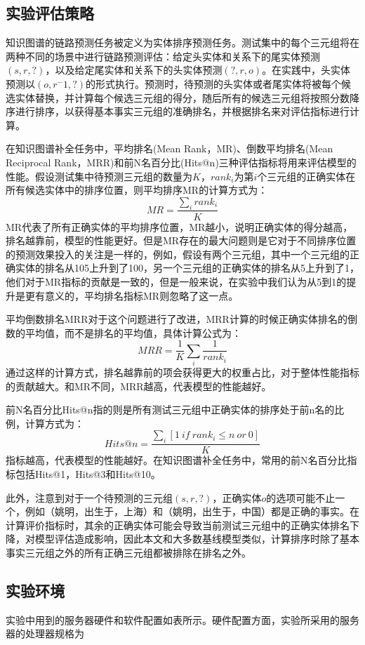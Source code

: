 \subsection{实验评估策略}

知识图谱的链路预测任务被定义为实体排序预测任务。测试集中的每个三元组将在两种不同的场景中进行链路预测评估：给定头实体和关系下的尾实体预测$(s,r,?)$，以及给定尾实体和关系下的头实体预测$(?,r,o)$。在实践中，头实体预测以$(o,r^-1,?)$的形式执行。预测时，待预测的头实体或者尾实体将被每个候选实体替换，并计算每个候选三元组的得分，随后所有的候选三元组将按照分数降序进行排序，以获得基本事实三元组的准确排名，并根据排名来对评估指标进行计算。

在知识图谱补全任务中，平均排名(Mean Rank，MR)、倒数平均排名(Mean Reciprocal Rank，MRR)和前N名百分比(Hits@n)三种评估指标将用来评估模型的性能。假设测试集中待预测三元组的数量为$K$，$rank_i$为第$i$个三元组的正确实体在所有候选实体中的排序位置，则平均排序MR的计算方式为：
\begin{equation}
    MR = \frac{\sum_i rank_i}{K}
\end{equation}
MR代表了所有正确实体的平均排序位置，MR越小，说明正确实体的得分越高，排名越靠前，模型的性能更好。但是MR存在的最大问题则是它对于不同排序位置的预测效果投入的关注是一样的，例如，假设有两个三元组，其中一个三元组的正确实体的排名从105上升到了100，另一个三元组的正确实体的排名从5上升到了1，他们对于MR指标的贡献是一致的，但是一般来说，在实验中我们认为从5到1的提升是更有意义的，平均排名指标MR则忽略了这一点。

平均倒数排名MRR对于这个问题进行了改进，MRR计算的时候正确实体排名的倒数的平均值，而不是排名的平均值，具体计算公式为：
\begin{equation}
    MRR = \frac{1}{K} \sum_i \frac{1}{rank_i}
\end{equation}
通过这样的计算方式，排名越靠前的项会获得更大的权重占比，对于整体性能指标的贡献越大。和MR不同，MRR越高，代表模型的性能越好。

前N名百分比Hits@n指的则是所有测试三元组中正确实体的排序处于前n名的比例，计算方式为：
\begin{equation}
    Hits@n = \frac{\sum_i \left[1 \ if \ rank_i \leq n \ or \ 0\right] }{K}
\end{equation}
指标越高，代表模型的性能越好。在知识图谱补全任务中，常用的前N名百分比指标包括Hits@1，Hits@3和Hits@10。

此外，注意到对于一个待预测的三元组$(s,r,?)$，正确实体$o$的选项可能不止一个，例如（姚明，出生于，上海）和（姚明，出生于，中国）都是正确的事实。在计算评价指标时，其余的正确实体可能会导致当前测试三元组中的正确实体排名下降，对模型评估造成影响，因此本文和大多数基线模型类似，计算排序时除了基本事实三元组之外的所有正确三元组都被排除在排名之外。

\subsection{实验环境}

实验中用到的服务器硬件和软件配置如表所示。硬件配置方面，实验所采用的服务器的处理器规格为